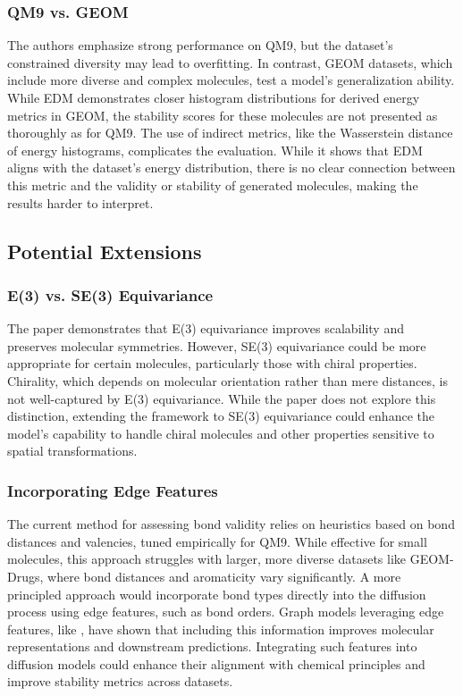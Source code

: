 \documentclass[sigconf]{acmart}
\begin{document}
\subsubsection{QM9 vs. GEOM}
The authors emphasize strong performance on QM9, but the dataset's constrained diversity may lead to overfitting. In contrast, GEOM datasets, which include more diverse and complex molecules, test a model’s generalization ability. While EDM demonstrates closer histogram distributions for derived energy metrics in GEOM, the stability scores for these molecules are not presented as thoroughly as for QM9. The use of indirect metrics, like the Wasserstein distance of energy histograms, complicates the evaluation. While it shows that EDM aligns with the dataset’s energy distribution, there is no clear connection between this metric and the validity or stability of generated molecules, making the results harder to interpret.

\subsection{Potential Extensions}
\subsubsection{E(3) vs. SE(3) Equivariance}
The paper demonstrates that E(3) equivariance improves scalability and preserves molecular symmetries. However, SE(3) equivariance could be more appropriate for certain molecules, particularly those with chiral properties. Chirality, which depends on molecular orientation rather than mere distances, is not well-captured by E(3) equivariance. While the paper does not explore this distinction, extending the framework to SE(3) equivariance could enhance the model’s capability to handle chiral molecules and other properties sensitive to spatial transformations.

\subsubsection{Incorporating Edge Features}
The current method for assessing bond validity relies on heuristics based on bond distances and valencies, tuned empirically for QM9. While effective for small molecules, this approach struggles with larger, more diverse datasets like GEOM-Drugs, where bond distances and aromaticity vary significantly. A more principled approach would incorporate bond types directly into the diffusion process using edge features, such as bond orders. Graph models leveraging edge features, like \cite{gilmer2017neuralmessagepassingquantum}, have shown that including this information improves molecular representations and downstream predictions. Integrating such features into diffusion models could enhance their alignment with chemical principles and improve stability metrics across datasets.
\end{document}
